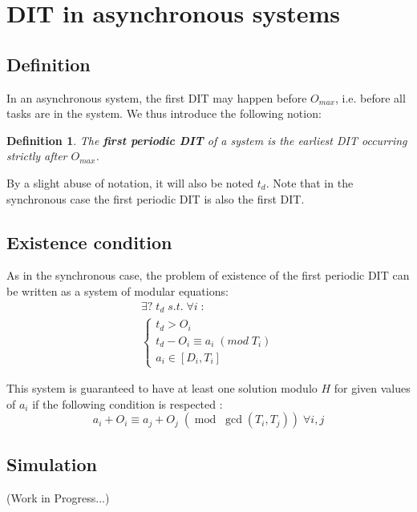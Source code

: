 \documentclass[times, 10pt,twocolumn, a4paper]{article}
\newtheorem{definition}{Definition}
\begin{document}
\section{DIT in asynchronous systems}
	\label{sct:asyncDIT}

	\subsection{Definition}

		In an asynchronous system, the first DIT may happen before $O_{max}$, i.e. before all tasks are in the system. We thus introduce the following notion:

		\begin{definition}
			The \textbf{first periodic DIT} of a system is the earliest DIT occurring
			strictly after $O_{max}$.
		\end{definition}

		By a slight abuse of notation, it will also be noted $t_d$. Note that in the
		synchronous case the first periodic DIT is also the first DIT.

	\subsection{Existence condition}
  \label{sct:FPDITexist}
		As in the synchronous case, the problem of existence of the first periodic DIT
		can be written as a system of modular equations:
		\[
			\begin{array}{l}
				\exists ? \; t_d \; s.t. \; \forall i \; :\\
				\left\{
					\begin{array}{l}
						t_d > O_i \\
						t_d - O_i \equiv a_i \; (mod \; T_i) \\
						a_i \in [D_i, T_i]
					\end{array}
				\right.
			\end{array}
		\]

		This system is guaranteed to have at least one solution modulo $H$ for given
		values of $a_i$ if the following condition is respected :
		\[
			a_i + O_i \equiv a_j + O_j \; (\operatorname{mod} \; \operatorname{gcd}(T_i,
			T_j)) \; \forall i,j
		\]

  \subsection{Simulation}

  (Work in Progress...)
\end{document}
